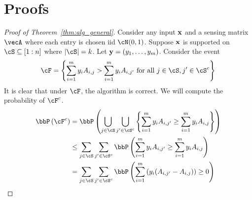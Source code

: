 \section{Proofs}\label{sec:proofs}
\begin{proof}[Proof of Theorem~\ref{thm:alg_general}]
Consider any input $\mathbf{x}$ and a sensing matrix $\vecA$ where each entry is chosen iid $\cN(0,1)$. Suppose ${\mathbf{x}}$ is supported on $\cS\subseteq[1:n]$ where $|\cS|=k$. Let $\mathbf{y} = (y_1, \ldots, y_m)$. Consider the event
\begin{align*}
    \cF = \inb{\sum_{i=1}^m{ {y_i A_{i,j}}}> \sum_{i=1}^m{ {y_i A_{i,j'}}}\text{ for all } j \in \cS,  j'\in\cS^c}
\end{align*}
It is clear that under $\cF$, the algorithm is correct.
We will compute the probability of $\cF^c$.
\begin{align}
\bbP\inp{\cF^c} &= \bbP\inp{\bigcup_{j\in\cS}\bigcup_{j'\in \cS^c}\inb{\sum_{i=1}^m{ {y_i A_{i,j'}}}\geq \sum_{i=1}^m{ {y_i A_{i,j}}}}}\nonumber\\
&\leq \sum_{j\in\cS}\sum_{j'\in \cS^c}\bbP\inp{\sum_{i=1}^m{ {y_i A_{i,j'}}}\geq \sum_{i=1}^m{ {y_i A_{i,j}}}}\nonumber\\
&=\sum_{j\in\cS}\sum_{j'\in \cS^c}\bbP\inp{\sum_{i=1}^m{ \inp{y_i (A_{i,j'}-A_{i,j})}}\geq 0}\label{eq:log_prob_f^c1}
\end{align}


\end{proof}
